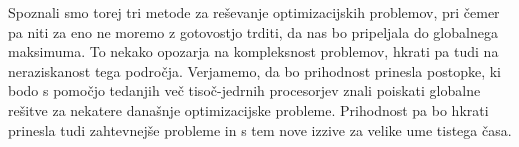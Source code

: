 \documentclass[a4paper,10pt]{article}
\begin{document}
Spoznali smo torej tri metode za reševanje optimizacijskih problemov, pri čemer pa niti za eno
ne moremo z gotovostjo trditi, da nas bo pripeljala do globalnega maksimuma. To nekako opozarja
na kompleksnost problemov, hkrati pa tudi na neraziskanost tega področja. Verjamemo, da bo
prihodnost prinesla postopke, ki bodo s pomočjo tedanjih več tisoč-jedrnih procesorjev znali
poiskati globalne rešitve za nekatere današnje optimizacijske probleme. Prihodnost pa bo
hkrati prinesla tudi zahtevnejše probleme in s tem nove izzive za velike ume tistega časa.
\end{document}
